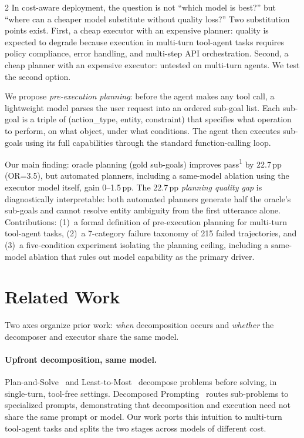 \documentclass[11pt,a4paper]{article}
\begin{document}
\begin{multicols}{2}
In cost-aware deployment, the question is not ``which model is best?'' but ``where can a cheaper model substitute without quality loss?'' Two substitution points exist. First, a cheap executor with an expensive planner: quality is expected to degrade because execution in multi-turn tool-agent tasks requires policy compliance, error handling, and multi-step API orchestration. Second, a cheap planner with an expensive executor: untested on multi-turn agents. We test the second option.

We propose \emph{pre-execution planning}: before the agent makes any tool call, a lightweight model parses the user request into an ordered sub-goal list. Each sub-goal is a triple of (action\_type, entity, constraint) that specifies what operation to perform, on what object, under what conditions. The agent then executes sub-goals using its full capabilities through the standard function-calling loop.

Our main finding: oracle planning (gold sub-goals) improves pass\textsuperscript{1} by 22.7\,pp (OR=3.5), but automated planners, including a same-model ablation using the executor model itself, gain 0--1.5\,pp. The 22.7\,pp \emph{planning quality gap} is diagnostically interpretable: both automated planners generate half the oracle's sub-goals and cannot resolve entity ambiguity from the first utterance alone. Contributions: (1)~a formal definition of pre-execution planning for multi-turn tool-agent tasks, (2)~a 7-category failure taxonomy of 215 failed trajectories, and (3)~a five-condition experiment isolating the planning ceiling, including a same-model ablation that rules out model capability as the primary driver.


\section{Related Work}

Two axes organize prior work: \emph{when} decomposition occurs and \emph{whether} the decomposer and executor share the same model.

\paragraph{Upfront decomposition, same model.} Plan-and-Solve~\citep{wang2023plan} and Least-to-Most~\citep{zhou2023least} decompose problems before solving, in single-turn, tool-free settings. Decomposed Prompting~\citep{khot2023decomposed} routes sub-problems to specialized prompts, demonstrating that decomposition and execution need not share the same prompt or model. Our work ports this intuition to multi-turn tool-agent tasks and splits the two stages across models of different cost.


\end{multicols}
\end{document}
